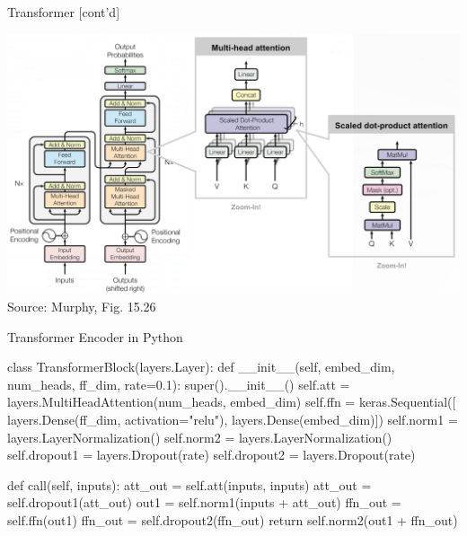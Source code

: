 \documentclass[ignorenonframetext,xcolor=x11names]{beamer}
\begin{document}
\begin{frame}{Transformer \small [cont'd]}
\centering

\includegraphics[width=\textwidth]{murphy_15_26.png} \\

\scriptsize Source: Murphy, Fig. 15.26 \normalsize
\end{frame}

\begin{frame}[fragile]{Transformer Encoder in Python}

\begin{pythoncode}
class TransformerBlock(layers.Layer):
    def __init__(self, embed_dim, num_heads, ff_dim, rate=0.1):
        super().__init__()
        self.att = layers.MultiHeadAttention(num_heads, 
                                             embed_dim)
        self.ffn = keras.Sequential([
                layers.Dense(ff_dim, activation="relu"),
                layers.Dense(embed_dim)])
        self.norm1 = layers.LayerNormalization()
        self.norm2 = layers.LayerNormalization()
        self.dropout1 = layers.Dropout(rate)
        self.dropout2 = layers.Dropout(rate)

    def call(self, inputs):
        att_out = self.att(inputs, inputs)
        att_out = self.dropout1(att_out)
        out1 = self.norm1(inputs + att_out)
        ffn_out = self.ffn(out1)
        ffn_out = self.dropout2(ffn_out)
        return self.norm2(out1 + ffn_out)
\end{pythoncode}
\end{frame}
\end{document}
